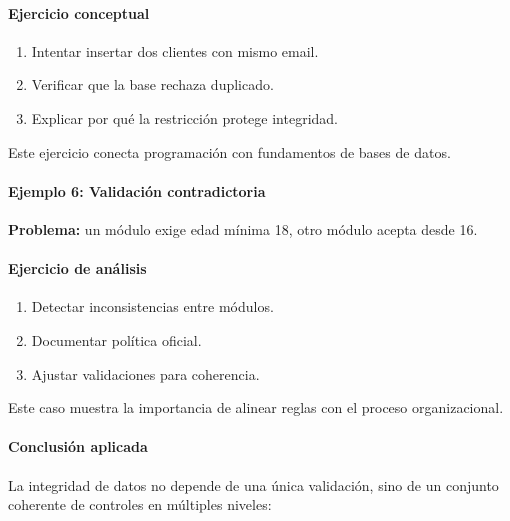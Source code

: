 \documentclass[12pt,twoside]{book}
\begin{document}
						\paragraph{Ejercicio conceptual}
						
						\begin{enumerate}
							\item Intentar insertar dos clientes con mismo email.
							\item Verificar que la base rechaza duplicado.
							\item Explicar por qué la restricción protege integridad.
						\end{enumerate}
						
						\noindent
						Este ejercicio conecta programación con fundamentos de bases de datos.
						
						\paragraph{Ejemplo 6: Validación contradictoria}
						
						\noindent
						\textbf{Problema:} un módulo exige edad mínima 18, otro módulo acepta desde 16.
						
						\paragraph{Ejercicio de análisis}
						
						\begin{enumerate}
							\item Detectar inconsistencias entre módulos.
							\item Documentar política oficial.
							\item Ajustar validaciones para coherencia.
						\end{enumerate}
						
						\noindent
						Este caso muestra la importancia de alinear reglas con el proceso organizacional.
						
						\paragraph{Conclusión aplicada}
						
						La integridad de datos no depende de una única validación, sino de un conjunto coherente de controles en múltiples niveles:
						
\end{document}
